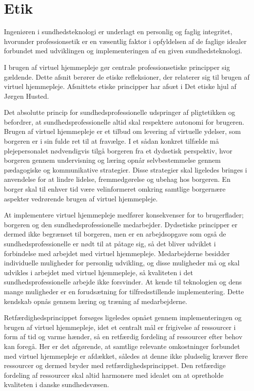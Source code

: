 \chapter{Etik}
Ingeniøren i sundhedsteknologi er underlagt en personlig og faglig integritet, hvorunder professionsetik er en væsentlig faktor i opfyldelsen af de faglige idealer forbundet med udviklingen og implementeringen af en given sundhedsteknologi.  

I brugen af virtuel hjemmepleje gør centrale professionsetiske principper sig gældende. Dette afsnit berører de etiske refleksioner, der relaterer sig til brugen af virtuel hjemmepleje. Afsnittets etiske principper har afsæt i Det etiske hjul af Jørgen Husted. 

Det absolutte princip for sundhedsprofessionelle udspringer af pligtetikken og befordrer, at sundhedsprofessionelle altid skal respektere autonomi for brugeren. Brugen af virtuel hjemmepleje er et tilbud om levering af virtuelle ydelser, som borgeren er i sin fulde ret til at fravælge. I et sådan konkret tilfælde må plejepersonalet nødvendigvis tilgå borgeren fra et dydsetisk perspektiv, hvor borgeren gennem undervisning og læring opnår selvbestemmelse gennem pædagogiske og kommunikative strategier. Disse strategier skal ligeledes bringes i anvendelse for at lindre lidelse, fremmedgørelse og ubehag hos borgeren. En borger skal til enhver tid være velinformeret omkring samtlige borgernære aspekter vedrørende brugen af virtuel hjemmepleje. 

At implementere virtuel hjemmepleje medfører konsekvenser for to brugerflader; borgeren og den sundhedsprofessionelle medarbejder. Dydsetiske principper er dermed ikke begrænset til borgeren, men er en arbejdsopgave som også de sundhedsprofessionelle er nødt til at påtage sig, så det bliver udviklet i forbindelse med arbejdet med virtuel hjemmepleje. Medarbejderne besidder individuelle muligheder for personlig udvikling, og disse muligheder må og skal udvikles i arbejdet med virtuel hjemmepleje, så kvaliteten i det sundhedsprofessionelle arbejde ikke forsvinder. At kende til teknologien og dens mange muligheder er en forudsætning for tilfredsstillende implementering. Dette kendskab opnås gennem læring og træning af medarbejderne. 

Retfærdighedsprincippet forsøges ligeledes opnået gennem implementeringen og brugen af virtuel hjemmepleje, idet et centralt mål er frigivelse af ressourcer i form af tid og varme hænder, så en retfærdig fordeling af ressourcer efter behov kan foregå. Her er det afgørende, at samtlige relevante omkostninger forbundet med virtuel hjemmepleje er afdækket, således at denne ikke pludselig kræver flere ressourcer og dermed bryder med retfærdighedsprincippet. Den retfærdige fordeling af ressourcer skal altid harmonere med idealet om at opretholde kvaliteten i danske sundhedsvæsen.

